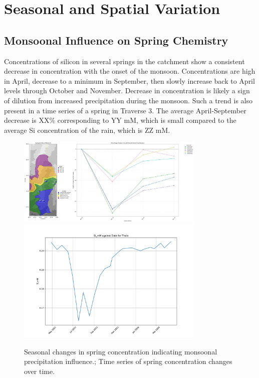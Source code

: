 
\section{Seasonal and Spatial Variation}

\subsection{Monsoonal Influence on Spring Chemistry}
Concentrations of silicon in several springs in the catchment show a consistent decrease in concentration with the onset of the monsoon. Concentrations are high in April, decrease to a minimum in September, then slowly increase back to April levels through October and November. Decrease in concentration is likely a sign of dilution from increased precipitation during the monsoon. Such a trend is also present in a time series of a spring in Traverse 3. The average April-September decrease is XX\% corresponding to YY mM, which is small compared to the average Si concentration of the rain, which is ZZ mM.



\begin{figure}[h]
    \centering
    \includegraphics[width=0.8\textwidth]{Si_mM_percentage_change_springs.pdf}
    \includegraphics[width=0.8\textwidth]{Si_mM_Thalo_timeseries.pdf}
    \caption{Seasonal changes in spring concentration indicating monsoonal precipitation influence.; Time series of spring concentration changes over time.}
    \label{fig:time_series_changes}
\end{figure}

